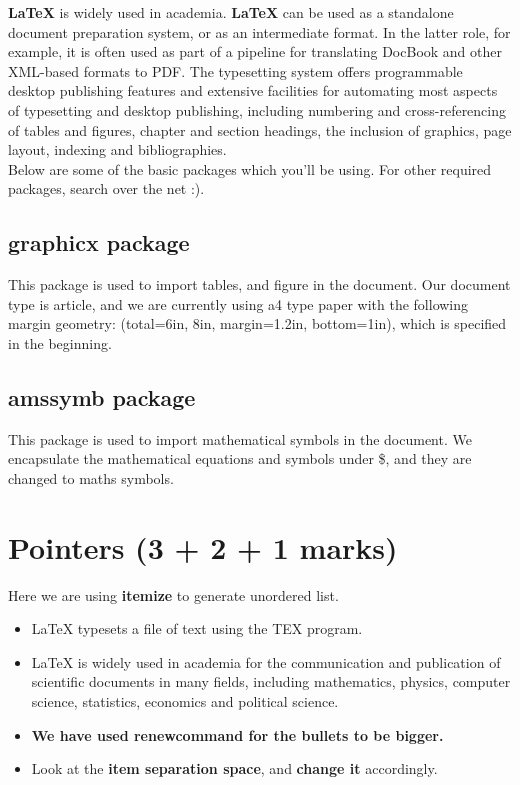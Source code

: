 \documentclass[11pt]{article}
\begin{document}
{\textbf{\LaTeX{}}} is widely used in academia. {\textbf{\LaTeX{}}} can be used as a standalone document preparation system, or as an intermediate format. In the latter role, for example, it is often used as part of a pipeline for translating DocBook and other XML-based formats to PDF. The typesetting system offers programmable desktop publishing features and extensive facilities for automating most aspects of typesetting and desktop publishing, including numbering and cross-referencing of tables and figures, chapter and section headings, the inclusion of graphics, page layout, indexing and bibliographies.\\

Below are some of the basic packages which you’ll be using. For other required packages, search over the net :).

\subsection{graphicx package}
\noindent 
This package is used to import tables, and figure in the document. Our document type is article, and we are currently using a4 type paper with the following margin geometry: (total={6in, 8in}, margin=1.2in, bottom=1in), which is specified in the beginning.

\subsection{amssymb package}
\noindent
This package is used to import mathematical symbols in the document. We
encapsulate the mathematical equations and symbols under \$, and they are
changed to maths symbols.

\section{Pointers (3 + 2 + 1 marks)}
\noindent
Here we are using {\textbf{itemize}} to generate unordered list.
\begin{itemize}
	\item \LaTeX{} typesets a file of text using the TEX program.\\
	\item \LaTeX{} is widely used in academia for the communication and publication of scientific documents in many fields, including mathematics, physics, computer science, statistics, economics and political science.\\
	\item {\textbf{We have used renewcommand for the bullets to be bigger.}}\\
	\item Look at the {\textbf{item separation space}}, and {\textbf{change it}} accordingly.	
\end{itemize}
\end{document}
